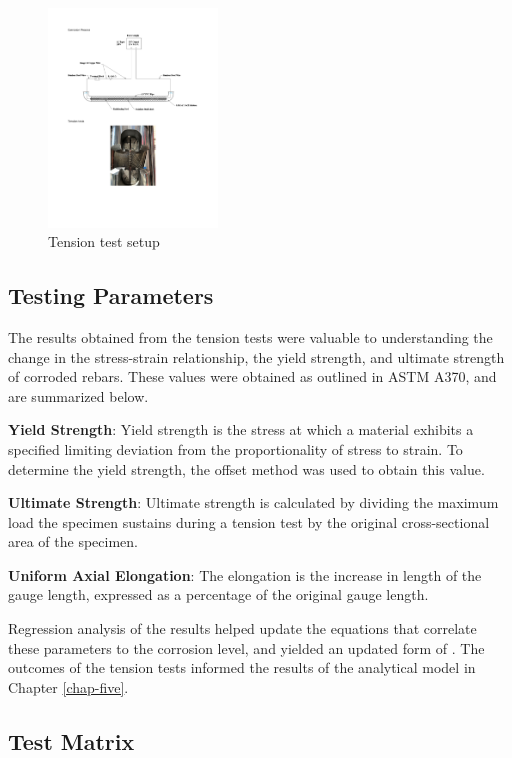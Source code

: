 \begin{figure}[htbp]
	\centering
	\includegraphics[width=0.4\textwidth]{VAC Thesis 2.0/Chapter-3/figs/tension_test_utm.pdf}
	\caption{Tension test setup}
	\label{fig:TensionTest}
\end{figure}

\subsection{Testing Parameters}
The results obtained from the tension tests were valuable to understanding the change in the stress-strain relationship, the yield strength, and ultimate strength of corroded rebars. These values were obtained as outlined in ASTM A370, and are summarized below.

\textbf{Yield Strength}: Yield strength is the stress at which a material exhibits a specified limiting deviation from the proportionality of stress to strain. To determine the yield strength, the offset method was used to obtain this value.

\textbf{Ultimate Strength}: Ultimate strength is calculated by dividing the maximum load the specimen sustains during a tension test by the original cross-sectional area of the specimen.

\textbf{Uniform Axial Elongation}: The elongation is the increase in length of the gauge length, expressed as a percentage of the original gauge length.

Regression analysis of the results helped update the equations that correlate these parameters to the corrosion level, and yielded an updated form of . The outcomes of the tension tests informed the results of the analytical model in Chapter \ref{chap-five}.

\subsection{Test Matrix}

